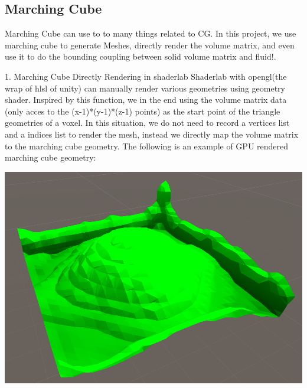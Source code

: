 \documentclass[acmtog]{acmart}
\begin{document}
\subsection{Marching Cube}
Marching Cube can use to to many things related to CG.
In this project, we use marching cube to generate Meshes, directly render the volume matrix, 
and even use it to do the bounding coupling between solid volume matrix and fluid!.

1. Marching Cube Directly Rendering in shaderlab
Shaderlab with opengl(the wrap of hlsl of unity) can manually render various geometries using geometry shader. 
Inspired by this function, we in the end using the volume matrix data (only acces to the (x-1)*(y-1)*(z-1) points)
 as the start point of the triangle geometries of a voxel. In this situation, we do not need to record 
 a vertices list and a indices list to render the mesh, instead we directly map the volume matrix to the marching cube geometry.
 The following is an example of GPU rendered marching cube geometry:
 \begin{center}
     \includegraphics[width=0.9\linewidth]{../Images/MarchingCube_GPU.PNG}
 \end{center}
\end{document}
